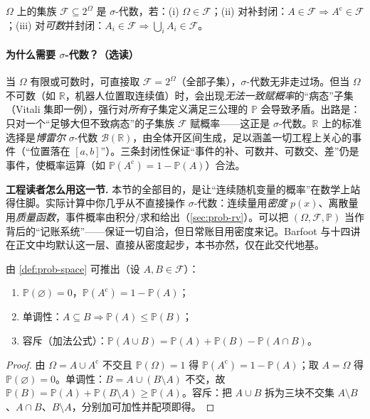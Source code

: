 \begin{definition}[$\sigma$-代数]\label{def:sigma-algebra}
$\Omega$ 上的集族 $\mathcal{F}\subseteq2^{\Omega}$ 是 $\sigma$-代数，若：(i) $\Omega\in\mathcal{F}$；(ii) 对补封闭：$A\in\mathcal{F}\Rightarrow A^{\mathrm c}\in\mathcal{F}$；(iii) 对\emph{可数}并封闭：$A_i\in\mathcal{F}\Rightarrow\bigcup_i A_i\in\mathcal{F}$。
\end{definition}

\paragraph{为什么需要 $\sigma$-代数？（选读）}
当 $\Omega$ 有限或可数时，可直接取 $\mathcal{F}=2^{\Omega}$（全部子集），$\sigma$-代数无非走过场。但当 $\Omega$ 不可数（如 $\mathbb{R}$，机器人位置取连续值）时，会出现\emph{无法一致赋概率}的“病态”子集（Vitali 集即一例），强行对\emph{所有}子集定义满足三公理的 $\mathbb{P}$ 会导致矛盾。出路是：只对一个“足够大但不致病态”的子集族 $\mathcal{F}$ 赋概率——这正是 $\sigma$-代数。$\mathbb{R}$ 上的标准选择是\emph{博雷尔} $\sigma$-代数 $\mathcal{B}(\mathbb{R})$，由全体开区间生成，足以涵盖一切工程上关心的事件（“位置落在 $[a,b]$”）。三条封闭性保证“事件的补、可数并、可数交、差”仍是事件，使概率运算（如 $\mathbb{P}(A^{\mathrm c})=1-\mathbb{P}(A)$）合法。

\begin{note}
\textbf{工程读者怎么用这一节.}\;
本节的全部目的，是让“连续随机变量的概率”在数学上站得住脚。实际计算中你几乎从不直接操作 $\sigma$-代数：连续量用\emph{密度} $p(x)$、离散量用\emph{质量函数}，事件概率由积分/求和给出（\cref{sec:prob-rv}）。可以把 $(\Omega,\mathcal{F},\mathbb{P})$ 当作背后的“记账系统”——保证一切自洽，但日常账目用密度来记。Barfoot\cite{barfoot2024state} 与十四讲\cite{gaoxiang2019slam14} 在正文中均默认这一层、直接从密度起步，本书亦然，仅在此交代地基。
\end{note}

\begin{proposition}[概率的基本运算法则]\label{prop:prob-rules}
由 \cref{def:prob-space} 可推出（设 $A,B\in\mathcal{F}$）：
\begin{enumerate}
  \item $\mathbb{P}(\varnothing)=0$，$\mathbb{P}(A^{\mathrm c})=1-\mathbb{P}(A)$；
  \item 单调性：$A\subseteq B\Rightarrow\mathbb{P}(A)\le\mathbb{P}(B)$；
  \item 容斥（加法公式）：$\mathbb{P}(A\cup B)=\mathbb{P}(A)+\mathbb{P}(B)-\mathbb{P}(A\cap B)$。
\end{enumerate}
\end{proposition}
\begin{proof}
由 $\Omega=A\cup A^{\mathrm c}$ 不交且 $\mathbb{P}(\Omega)=1$ 得 $\mathbb{P}(A^{\mathrm c})=1-\mathbb{P}(A)$；取 $A=\Omega$ 得 $\mathbb{P}(\varnothing)=0$。单调性：$B=A\cup(B\setminus A)$ 不交，故 $\mathbb{P}(B)=\mathbb{P}(A)+\mathbb{P}(B\setminus A)\ge\mathbb{P}(A)$。容斥：把 $A\cup B$ 拆为三块不交集 $A\setminus B$、$A\cap B$、$B\setminus A$，分别加可加性并配项即得。
\end{proof}

